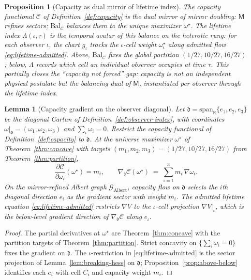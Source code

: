\documentclass[aps,prd,onecolumn,amsmath,amssymb,nofootinbib,11pt]{revtex4-2}
\numberwithin{equation}{section}
\theoremstyle{plain}
\newtheorem{lemma}[theorem]{Lemma}
\newtheorem{proposition}[theorem]{Proposition}
\theoremstyle{definition}
\theoremstyle{remark}
\newcommand{\R}{\mathbb{R}}
\newcommand{\Mirror}{\mathsf{M}}
\newcommand{\capacity}{\mathcal{C}}
\begin{document}
\begin{proposition}[Capacity as dual mirror of lifetime index]
\label{prop:capacity-lifetime-dual}
The capacity functional $\capacity$ of Definition~\ref{def:capacity} is the
\emph{dual mirror} of mirror doubling: $\Mirror$ refines sectors;
$\mathrm{Bal}_{\mathcal{C}}$ balances them to the unique maximizer
$\omega^\star$. The lifetime index $\Lambda(\iota,\tau)$ is the
\emph{temporal} avatar of this balance on the heterotic rung: for each observer
$\iota$, the chart $g_\iota$ tracks the $\iota$-cell weight
$\omega^\star_\iota$ along admitted flow \eqref{eq:lifetime-admitted}. Above,
$\mathrm{Bal}_{\mathcal{C}}$ fixes the global partition $(1/27,10/27,16/27)$;
below, $\Lambda$ records which cell an individual observer occupies at time
$\tau$. This partially closes the ``capacity not forced'' gap: capacity is not
an independent physical postulate but the balancing dual of $\Mirror$,
instantiated per observer through the lifetime index.
\end{proposition}

\begin{lemma}[Capacity gradient on the observer diagonal]
\label{lem:capacity-gradient-d}
Let $\mathfrak{d}=\mathrm{span}_\R\{e_1,e_2,e_3\}$ be the diagonal Cartan of
Definition~\ref{def:observer-index}, with coordinates
$\omega|_{\mathfrak{d}}=(\omega_1,\omega_2,\omega_3)$ and
$\sum_i\omega_i=0$. Restrict the capacity functional of
Definition~\ref{def:capacity} to $\mathfrak{d}$. At the universe maximizer
$\omega^\star$ of Theorem~\ref{thm:concave} with targets
$(m_1,m_2,m_3)=(1/27,10/27,16/27)$ from Theorem~\ref{thm:partition},
\begin{equation}\label{eq:capacity-gradient-d}
  \frac{\partial\capacity}{\partial\omega_i}(\omega^\star)=m_i,
  \qquad
  \nabla_{\mathfrak{d}}\capacity(\omega^\star)
  \;=\;
  \sum_{i=1}^3 m_i\,\nabla\omega_i.
\end{equation}
On the mirror-refined Albert graph $\mathcal{G}_{\mathrm{Albert}}$, capacity
flow on $\mathfrak{d}$ selects the $i$th diagonal direction $e_i$ as the
gradient sector with weight $m_i$. The admitted lifetime equation
\eqref{eq:lifetime-admitted} restricts $\nabla V$ to the $\iota$-cell projection
$\nabla V|_{\iota}$, which is the below-level gradient direction of
$\nabla_{\mathfrak{d}}\capacity$ along $e_\iota$.
\end{lemma}

\begin{proof}
The partial derivatives at $\omega^\star$ are Theorem~\ref{thm:concave} with
the partition targets of Theorem~\ref{thm:partition}. Strict concavity on
$\{\sum_i\omega_i=0\}$ fixes the gradient on $\mathfrak{d}$. The
$\iota$-restriction in \eqref{eq:lifetime-admitted} is the sector projection
of Lemma~\ref{lem:breaking-hess} on $\mathfrak{d}$; Proposition~\ref{prop:above-below}
identifies each $e_i$ with cell $C_i$ and capacity weight $m_i$.
\end{proof}
\end{document}
